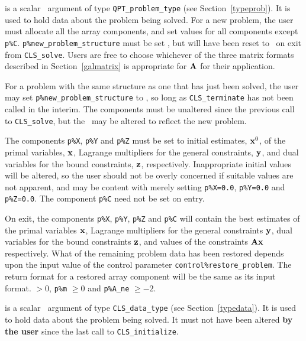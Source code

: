 \documentclass{galahad}
\newcommand{\packagename}{CLS}
\begin{document}
\vspace*{-3mm}
\begin{description}
 is a scalar \intentinout\ argument of type 
{\tt QPT\_problem\_type}
(see Section~\ref{typeprob}). 
It is used to hold data about the problem being solved.
For a new problem, the user must allocate all the array components,
and set values for all components except {\tt p\%C}.
{\tt p\%new\_problem\_structure} must be set \true, but will have been reset
to \false\ on exit from {\tt \packagename\_solve}.
Users are free to choose whichever
of the three matrix formats described in Section~\ref{galmatrix} 
is appropriate for ${\mathbf{A}}$ for their application.

For a problem with the same structure as one that has just been 
solved, the user may set {\tt p\%new\_problem\_str\-u\-cture} to \false,
so long as {\tt \packagename\_terminate} has not been called in the interim.
The \integer components must be unaltered since the
previous call to {\tt \packagename\_solve}, but the \realdp\ 
may be altered to reflect the new problem.

The components {\tt p\%X}, {\tt p\%Y} and {\tt p\%Z}
must be set to initial estimates, ${\mathbf{x}}^{0}$, of the primal variables, 
${\mathbf{x}}$, Lagrange multipliers for the general constraints, ${\mathbf{y}}$, 
and dual variables for the bound constraints, ${\mathbf{z}}$, respectively.
Inappropriate initial values will be altered, so the user should
not be overly concerned if suitable values are not apparent, and may be
content with merely setting {\tt p\%X=0.0},
{\tt p\%Y=0.0} and {\tt p\%Z=0.0}.
The component {\tt p\%C} need not be set on entry.

On exit, the components {\tt p\%X}, {\tt p\%Y}, {\tt p\%Z} and {\tt p\%C}
will contain the best estimates of the primal variables ${\mathbf{x}}$, 
Lagrange multipliers for the general
constraints ${\mathbf{y}}$, dual variables for the bound constraints ${\mathbf{z}}$, 
and values of the constraints ${\mathbf{A}} {\mathbf{x}}$ respectively.
What of the remaining problem data has been restored depends upon
the input value of the control parameter {\tt control\%restore\_problem}.
The return format for a restored array component will be the same as its
input format.
 $> 0$, {\tt p\%m} $\geq 0$ and {\tt p\%A\_ne} 
              $\geq -2$.

 is a scalar \intentinout\ argument of type 
{\tt \packagename\_data\_type}
(see Section~\ref{typedata}). It is used to hold data about the problem being 
solved. It must not have been altered {\bf by the user} since the last call to 
{\tt \packagename\_initialize}.


\end{description}
\end{document}
